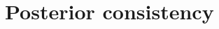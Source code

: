 \documentclass[aoas,preprint]{imsart}
\begin{document}




\section{Posterior consistency}

 
\end{document}
